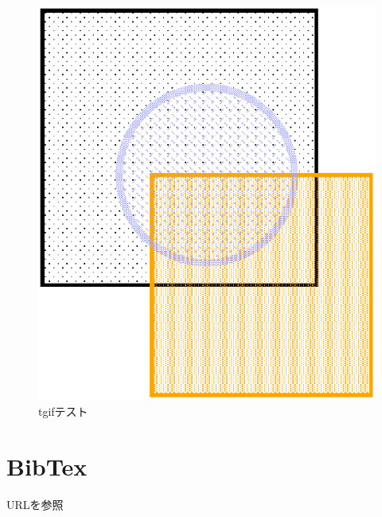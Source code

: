 \begin{figure}[t]
    \centering
    \includegraphics[width=\linewidth]{images/sample.eps}
    \caption{tgifテスト}
    \label{fig:tgif}
\end{figure}

\section{BibTex}
URL\cite{sagaweb}を参照
